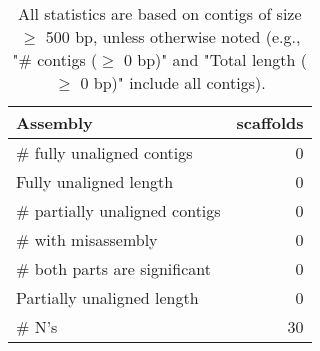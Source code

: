 \documentclass[12pt,a4paper]{article}
\begin{document}
\begin{table}[ht]
\begin{center}
\caption{All statistics are based on contigs of size $\geq$ 500 bp, unless otherwise noted (e.g., "\# contigs ($\geq$ 0 bp)" and "Total length ($\geq$ 0 bp)" include all contigs).}
\begin{tabular}{|l*{1}{|r}|}
\hline
Assembly & scaffolds \\ \hline
\# fully unaligned contigs & 0 \\ \hline
Fully unaligned length & 0 \\ \hline
\# partially unaligned contigs & 0 \\ \hline
\hspace{5mm}\# with misassembly & 0 \\ \hline
\hspace{5mm}\# both parts are significant & 0 \\ \hline
Partially unaligned length & 0 \\ \hline
\# N's & 30 \\ \hline
\end{tabular}
\end{center}
\end{table}
\end{document}
